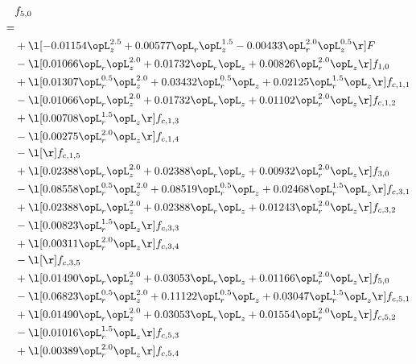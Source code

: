 \begin{alignat}{2} 
\label{eq:f_50_1} 
& f_{5,0} \nonumber \\ 
 = \\ 
& + \l[  -0.01154 \opL_z^{2.5} +  0.00577 \opL_r \opL_z^{1.5}   -0.00433 \opL_r^{2.0} \opL_z^{0.5}  \r] F \nonumber \\ 
& - \l[  0.01066 \opL_r \opL_z^{2.0} +  0.01732 \opL_r \opL_z +  0.00826 \opL_r^{2.0} \opL_z  \r] f_{1,0} \nonumber \\ 
& + \l[  0.01307 \opL_r^{0.5} \opL_z^{2.0} +  0.03432 \opL_r^{0.5} \opL_z +  0.02125 \opL_r^{1.5} \opL_z  \r] f_{c,1,1} \nonumber \\ 
& - \l[  0.01066 \opL_r \opL_z^{2.0} +  0.01732 \opL_r \opL_z +  0.01102 \opL_r^{2.0} \opL_z  \r] f_{c,1,2} \nonumber \\ 
& + \l[  0.00708 \opL_r^{1.5} \opL_z  \r] f_{c,1,3} \nonumber \\ 
& - \l[  0.00275 \opL_r^{2.0} \opL_z  \r] f_{c,1,4} \nonumber \\ 
& - \l[  \r] f_{c,1,5} \nonumber \\ 
& + \l[  0.02388 \opL_r \opL_z^{2.0} +  0.02388 \opL_r \opL_z +  0.00932 \opL_r^{2.0} \opL_z  \r] f_{3,0} \nonumber \\ 
& - \l[  0.08558 \opL_r^{0.5} \opL_z^{2.0} +  0.08519 \opL_r^{0.5} \opL_z +  0.02468 \opL_r^{1.5} \opL_z  \r] f_{c,3,1} \nonumber \\ 
& + \l[  0.02388 \opL_r \opL_z^{2.0} +  0.02388 \opL_r \opL_z +  0.01243 \opL_r^{2.0} \opL_z  \r] f_{c,3,2} \nonumber \\ 
& - \l[  0.00823 \opL_r^{1.5} \opL_z  \r] f_{c,3,3} \nonumber \\ 
& + \l[  0.00311 \opL_r^{2.0} \opL_z  \r] f_{c,3,4} \nonumber \\ 
& - \l[  \r] f_{c,3,5} \nonumber \\ 
& + \l[  0.01490 \opL_r \opL_z^{2.0} +  0.03053 \opL_r \opL_z +  0.01166 \opL_r^{2.0} \opL_z  \r] f_{5,0} \nonumber \\ 
& - \l[  0.06823 \opL_r^{0.5} \opL_z^{2.0} +  0.11122 \opL_r^{0.5} \opL_z +  0.03047 \opL_r^{1.5} \opL_z  \r] f_{c,5,1} \nonumber \\ 
& + \l[  0.01490 \opL_r \opL_z^{2.0} +  0.03053 \opL_r \opL_z +  0.01554 \opL_r^{2.0} \opL_z  \r] f_{c,5,2} \nonumber \\ 
& - \l[  0.01016 \opL_r^{1.5} \opL_z  \r] f_{c,5,3} \nonumber \\ 
& + \l[  0.00389 \opL_r^{2.0} \opL_z  \r] f_{c,5,4} \nonumber \\ 

\end{alignat}
